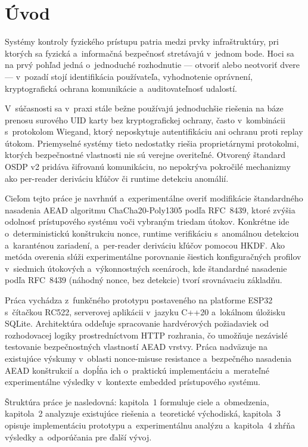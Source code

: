 \section*{Úvod}

Systémy kontroly fyzického prístupu patria medzi prvky infraštruktúry, pri ktorých sa fyzická a~informačná bezpečnosť stretávajú v~jednom bode. Hoci sa na prvý pohľad jedná o~jednoduché rozhodnutie --- otvoriť alebo neotvoriť dvere --- v~pozadí stojí identifikácia používateľa, vyhodnotenie oprávnení, kryptografická ochrana komunikácie a~auditovateľnosť udalostí.

V~súčasnosti sa v~praxi stále bežne používajú jednoduchšie riešenia na báze prenosu surového UID karty bez kryptografickej ochrany, často v~kombinácii s~protokolom Wiegand, ktorý neposkytuje autentifikáciu ani ochranu proti replay útokom. Priemyselné systémy tieto nedostatky riešia proprietárnymi protokolmi, ktorých bezpečnostné vlastnosti nie sú verejne overiteľné. Otvorený štandard OSDP v2 pridáva šifrovanú komunikáciu, no nepokrýva pokročilé mechanizmy ako per-reader deriváciu kľúčov či runtime detekciu anomálií.

Cieľom tejto práce je navrhnúť a~experimentálne overiť modifikácie štandardného nasadenia AEAD algoritmu ChaCha20-Poly1305 podľa RFC~8439, ktoré zvýšia odolnosť prístupového systému voči vybraným triedam útokov. Konkrétne ide o~deterministickú konštrukciu nonce, runtime verifikáciu s~anomálnou detekciou a~karanténou zariadení, a~per-reader deriváciu kľúčov pomocou HKDF. Ako metóda overenia slúži experimentálne porovnanie šiestich konfiguračných profilov v~siedmich útokových a~výkonnostných scenároch, kde štandardné nasadenie podľa RFC~8439 (náhodný nonce, bez detekcie) tvorí srovnávaciu základňu.

Práca vychádza z~funkčného prototypu postaveného na platforme ESP32 s~čítačkou RC522, serverovej aplikácii v~jazyku C++20 a~lokálnom úložisku SQLite. Architektúra oddeľuje spracovanie hardvérových požiadaviek od rozhodovacej logiky prostredníctvom HTTP rozhrania, čo umožňuje nezávislé testovanie bezpečnostných vlastností AEAD vrstvy. Práca nadväzuje na existujúce výskumy v~oblasti nonce-misuse resistance a~bezpečného nasadenia AEAD konštrukcií a~dopĺňa ich o~praktickú implementáciu a~merateľné experimentálne výsledky v~kontexte embedded prístupového systému.

Štruktúra práce je nasledovná: kapitola~1 formuluje ciele a~obmedzenia, kapitola~2 analyzuje existujúce riešenia a~teoretické východiská, kapitola~3 opisuje implementáciu prototypu a~experimentálnu analýzu a~kapitola~4 zhŕňa výsledky a~odporúčania pre ďalší vývoj.